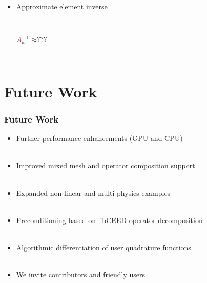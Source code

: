 \documentclass{beamer}
\begin{document}
\begin{frame}
\begin{center}
~\\

\begin{itemize}

\item Approximate element inverse

~\\

\begin{center}

${\color{burgundy}A}_e^{-1} \approx ???$

\end{center}

~\\

\end{itemize}


\end{center}
\end{frame}

\section{Future Work}

\begin{frame}
\begin{center}
\frametitle{Future Work}

\begin{itemize}

\item Further performance enhancements (GPU and CPU)\\

~\\

\item Improved mixed mesh and operator composition support\\

~\\

\item Expanded non-linear and multi-physics examples\\

~\\

\item Preconditioning based on libCEED operator decomposition\\

~\\

\item Algorithmic differentiation of user quadrature functions\\

~\\

\item We invite contributors and friendly users

\end{itemize}

\end{center}
\end{frame}
\end{document}
